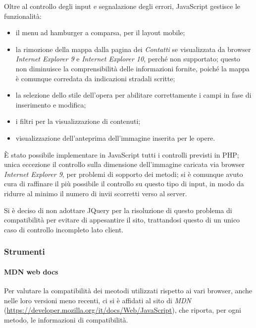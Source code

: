 Oltre al controllo degli input e segnalazione degli errori, JavaScript gestisce le funzionalità:
\begin{itemize}
	\item il menu ad hamburger a comparsa, per il layout mobile;
	\item la rimozione della mappa dalla pagina dei \textit{Contatti} se visualizzata da browser \textit{Internet Explorer 9} e \textit{Internet Explorer 10}, perché non supportato; questo non diminuisce la comprensibilità delle informazioni fornite, poiché la mappa è comunque corredata da indicazioni stradali scritte;
	\item la selezione dello stile dell'opera per abilitare correttamente i campi in fase di inserimento e modifica;
	\item i filtri per la visualizzazione di contenuti;
	\item visualizzazione dell'anteprima dell'immagine inserita per le opere.
\end{itemize}


È stato possibile implementare in JavaScript tutti i controlli previsti in PHP; unica eccezione il controllo sulla dimensione dell'immagine caricata via browser \textit{Internet Explorer 9}, per problemi di sopporto dei metodi; si è comunque avuto cura di raffinare il più possibile il controllo su questo tipo di input, in modo da ridurre al minimo il numero di invii scorretti verso al server.

Si è deciso di non adottare JQuery per la risoluzione di questo problema di compatibilità per evitare di appesantire il sito, trattandosi questo di un unico caso di controllo incompleto lato client.


\subsubsection{Strumenti}
\label{implementazione-javascript-strumenti}

\paragraph{MDN web docs}
\label{implementazione-javascript-strumenti-mdn}
Per valutare la compatibilità dei meotodi utilizzati rispetto ai vari browser, anche nelle loro versioni meno recenti, ci si è affidati al sito di \textit{MDN} (\url{https://developer.mozilla.org/it/docs/Web/JavaScript}), che riporta, per ogni metodo, le informazioni di compatibilità.

